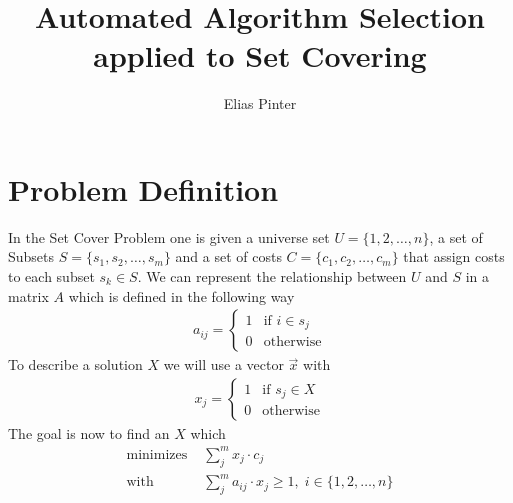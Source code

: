 \documentclass{article}
\title{Automated Algorithm Selection applied to Set Covering}
\author{Elias Pinter}
\begin{document}



\section{Problem Definition}
In the Set Cover Problem one is given a universe set $U = \{1,2,\dots, n\}$, a set of Subsets $S = \{s_1,s_2,\dots, s_m \}$ and a set of costs $C = \{c_1, c_2, \dots, c_m\}$ that assign costs
to each subset $s_k \in S$. We can represent the relationship between $U$ and $S$ in a matrix $A$ which is defined in the following way
\begin{align*}
      a_{ij} =
      \begin{cases}
            1 & \text{if } i \in s_j \\
            0 & \text{otherwise}
      \end{cases}
\end{align*}
To describe a solution $X$ we will use a vector $\vec{x}$ with
\begin{align*}
      x_{j} =
      \begin{cases}
            1 & \text{if } s_j \in X \\
            0 & \text{otherwise}
      \end{cases}
\end{align*}
The goal is now to find an $X$ which
\begin{align}
      \text{minimizes } & \sum_{j}^{m} x_j \cdot c_j                                      \\
      \text{with }      & \sum_{j}^{m} a_{ij} \cdot x_j \geq 1, \; i \in \{1,2,\dots, n\}
\end{align}
\newpage
\end{document}
